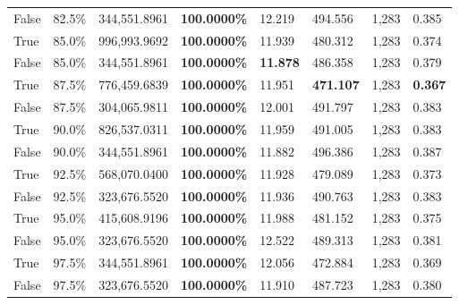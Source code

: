 \begin{table}[H]
\begin{tabular}{lllrllll}
\cline{1-8}
False & 82.5\% & 344,551.8961 & \bfseries \color{red} 100.0000\% & 12.219 & 494.556 & 1,283 & 0.385 \\
\cline{1-8}
True & 85.0\% & 996,993.9692 & \bfseries \color{red} 100.0000\% & 11.939 & 480.312 & 1,283 & 0.374 \\
\cline{1-8}
False & 85.0\% & 344,551.8961 & \bfseries \color{red} 100.0000\% & \bfseries \color{red} 11.878 & 486.358 & 1,283 & 0.379 \\
\cline{1-8}
True & 87.5\% & 776,459.6839 & \bfseries \color{red} 100.0000\% & 11.951 & \bfseries \color{red} 471.107 & 1,283 & \bfseries \color{red} 0.367 \\
\cline{1-8}
False & 87.5\% & \color{red} 304,065.9811 & \bfseries \color{red} 100.0000\% & 12.001 & 491.797 & 1,283 & 0.383 \\
\cline{1-8}
True & 90.0\% & 826,537.0311 & \bfseries \color{red} 100.0000\% & 11.959 & 491.005 & 1,283 & 0.383 \\
\cline{1-8}
False & 90.0\% & 344,551.8961 & \bfseries \color{red} 100.0000\% & 11.882 & 496.386 & 1,283 & 0.387 \\
\cline{1-8}
True & 92.5\% & 568,070.0400 & \bfseries \color{red} 100.0000\% & 11.928 & 479.089 & 1,283 & 0.373 \\
\cline{1-8}
False & 92.5\% & 323,676.5520 & \bfseries \color{red} 100.0000\% & 11.936 & 490.763 & 1,283 & 0.383 \\
\cline{1-8}
True & 95.0\% & 415,608.9196 & \bfseries \color{red} 100.0000\% & 11.988 & 481.152 & 1,283 & 0.375 \\
\cline{1-8}
False & 95.0\% & 323,676.5520 & \bfseries \color{red} 100.0000\% & 12.522 & 489.313 & 1,283 & 0.381 \\
\cline{1-8}
True & 97.5\% & 344,551.8961 & \bfseries \color{red} 100.0000\% & 12.056 & 472.884 & 1,283 & 0.369 \\
\cline{1-8}
False & 97.5\% & 323,676.5520 & \bfseries \color{red} 100.0000\% & 11.910 & 487.723 & 1,283 & 0.380 \\
\cline{1-8}
\bottomrule
\end{tabular}
\end{table}
